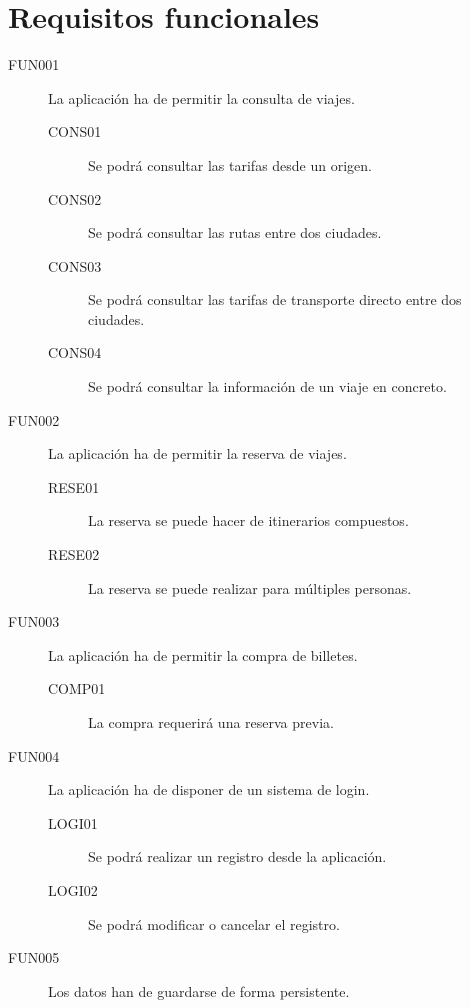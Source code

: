   \section{Requisitos funcionales}
    \begin{description}
      \item[FUN001] La aplicación ha de permitir la consulta de viajes.
      \begin{description}
	\item[CONS01] Se podrá consultar las tarifas desde un origen.
	\item[CONS02] Se podrá consultar las rutas entre dos ciudades.
	\item[CONS03] Se podrá consultar las tarifas de transporte directo entre dos ciudades.
	\item[CONS04] Se podrá consultar la información de un viaje en concreto.
      \end{description}

      \item[FUN002] La aplicación ha de permitir la reserva de viajes.
      \begin{description}
	\item [RESE01] La reserva se puede hacer de itinerarios compuestos.
	\item [RESE02] La reserva se puede realizar para múltiples personas.
      \end{description}

      \item[FUN003] La aplicación ha de permitir la compra de billetes.
      \begin{description}
	\item[COMP01] La compra requerirá una reserva previa.
      \end{description}

      \item[FUN004] La aplicación ha de disponer de un sistema de login.
      \begin{description}
	\item[LOGI01] Se podrá realizar un registro desde la aplicación.
	\item[LOGI02] Se podrá modificar o cancelar el registro.
      \end{description}

      \item[FUN005] Los datos han de guardarse de forma persistente.
    \end{description}


